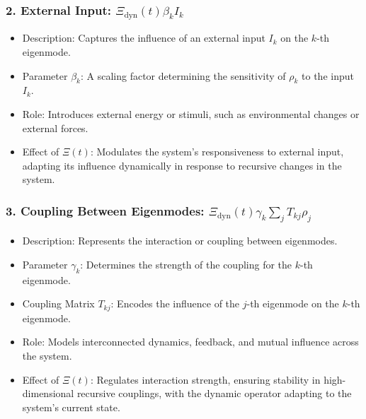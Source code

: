 \documentclass{article}
\theoremstyle{plain}
\begin{document}
\begin{itemize}
\subsubsection{2. External Input: \( \Xi_{\text{dyn}}(t) \beta_k I_k \)}
\begin{itemize}
    \item Description: Captures the influence of an external input \( I_k \) on the \( k \)-th eigenmode.
    \item Parameter \( \beta_k \): A scaling factor determining the sensitivity of \( \rho_k \) to the input \( I_k \).
    \item Role: Introduces external energy or stimuli, such as environmental changes or external forces.
    \item Effect of \(\Xi(t) \): Modulates the system’s responsiveness to external input, adapting its influence dynamically in response to recursive changes in the system.
\end{itemize}

\subsubsection{3. Coupling Between Eigenmodes: \( \Xi_{\text{dyn}}(t) \gamma_k \sum_j T_{kj} \rho_j \)}
\begin{itemize}
    \item Description: Represents the interaction or coupling between eigenmodes.
    \item Parameter \( \gamma_k \): Determines the strength of the coupling for the \( k \)-th eigenmode.
    \item Coupling Matrix \( T_{kj} \): Encodes the influence of the \( j \)-th eigenmode on the \( k \)-th eigenmode.
    \item Role: Models interconnected dynamics, feedback, and mutual influence across the system.
    \item Effect of \(\Xi(t) \): Regulates interaction strength, ensuring stability in high-dimensional recursive couplings, with the dynamic operator adapting to the system's current state.
\end{itemize}


\end{itemize}
\end{document}
